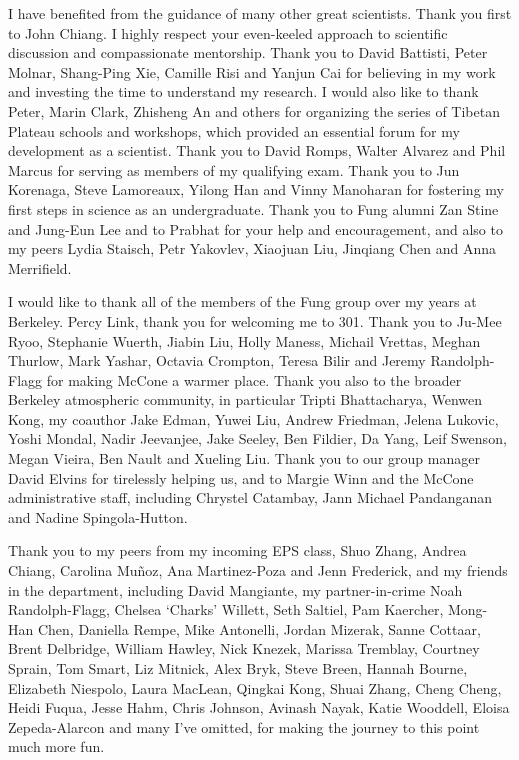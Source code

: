 \documentclass{ucbthesis}
\begin{document}
\begin{frontmatter}
\begin{acknowledgements}
I have benefited from the guidance of many other great scientists. Thank you first to John Chiang. I highly respect your even-keeled approach to scientific discussion and compassionate mentorship. Thank you to David Battisti, Peter Molnar, Shang-Ping Xie, Camille Risi and Yanjun Cai for believing in my work and investing the time to understand my research. I would also like to thank Peter, Marin Clark, Zhisheng An and others for organizing the series of Tibetan Plateau schools and workshops, which provided an essential forum for my development as a scientist. Thank you to David Romps, Walter Alvarez and Phil Marcus for serving as members of my qualifying exam. Thank you to Jun Korenaga, Steve Lamoreaux, Yilong Han and Vinny Manoharan for fostering my first steps in science as an undergraduate. Thank you to Fung alumni Zan Stine and Jung-Eun Lee and to Prabhat for your help and encouragement, and also to my peers Lydia Staisch, Petr Yakovlev, Xiaojuan Liu, Jinqiang Chen and Anna Merrifield.

I would like to thank all of the members of the Fung group over my years at Berkeley. Percy Link, thank you for welcoming me to 301. Thank you to Ju-Mee Ryoo, Stephanie Wuerth, Jiabin Liu, Holly Maness, Michail Vrettas, Meghan Thurlow, Mark Yashar, Octavia Crompton, Teresa Bilir and Jeremy Randolph-Flagg for making McCone a warmer place. Thank you also to the broader Berkeley atmospheric community, in particular Tripti Bhattacharya, Wenwen Kong, my coauthor Jake Edman, Yuwei Liu, Andrew Friedman, Jelena Lukovic, Yoshi Mondal, Nadir Jeevanjee, Jake Seeley, Ben Fildier, Da Yang, Leif Swenson, Megan Vieira, Ben Nault and Xueling Liu. Thank you to our group manager David Elvins for tirelessly helping us, and to Margie Winn and the McCone administrative staff, including Chrystel Catambay, Jann Michael Pandanganan and Nadine Spingola-Hutton.

Thank you to my peers from my incoming EPS class, Shuo Zhang, Andrea Chiang, Carolina Mu\~{n}oz, Ana Martinez-Poza and Jenn Frederick, and my friends in the department, including David Mangiante, my partner-in-crime Noah Randolph-Flagg, Chelsea `Charks' Willett, Seth Saltiel, Pam Kaercher, Mong-Han Chen, Daniella Rempe, Mike Antonelli, Jordan Mizerak, Sanne Cottaar, Brent Delbridge, William Hawley, Nick Knezek, Marissa Tremblay, Courtney Sprain, Tom Smart, Liz Mitnick, Alex Bryk, Steve Breen, Hannah Bourne, Elizabeth Niespolo, Laura MacLean, Qingkai Kong, Shuai Zhang, Cheng Cheng, Heidi Fuqua, Jesse Hahm, Chris Johnson, Avinash Nayak, Katie Wooddell, Eloisa Zepeda-Alarcon and many I've omitted, for making the journey to this point much more fun. 


\end{acknowledgements}
\end{frontmatter}
\end{document}
